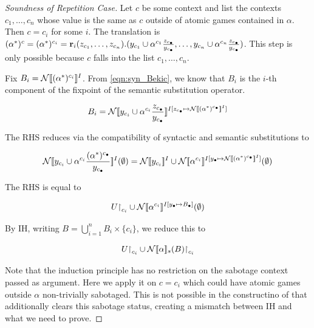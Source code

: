 \begin{proof}[Soundness of Repetition Case]
    Let $c$ be some context and list the contexts $c_1,\dots,c_n$ whose value is the same as $c$ outside of atomic games contained in $\alpha$. Then $c=c_i$ for some $i$. The translation is $\GLsrl{c}{(\alpha^*)} = \GLsrl{c_i}{(\alpha^*)} = \Rec_i(z_{c_1},\dots,z_{c_n}). (y_{c_1}\cup \alpha^{c_1}\frac{z_{c_\bullet}}{y_{c_\bullet}},\dots,y_{c_n}\cup \alpha^{c_n}\frac{z_{c_\bullet}}{y_{c_\bullet}})$. This step is only possible because $c$ falls into the list $c_1,\dots,c_n$.

    Fix $B_i = \N\ddl\GLsrl{c_i}{(\alpha^*)}\ddr^I$. From \autoref{eqn:syn_Bekic}, we know that $B_i$ is the $i$-th component of the fixpoint of the semantic substitution operator.

    \[B_i = \N\ddl y_{c_i}\cup \alpha^{c_i}\frac{z_{c_\bullet}}{y_{c_\bullet}} \ddr^{I[z_{c_\bullet} \mapsto \N\ddl(\alpha^*)^{c_\bullet}\ddr^I]}\]

    The RHS reduces via the compatibility of syntactic and semantic substitutions to

    \[\N\ddl y_{c_i}\cup \alpha^{c_i}\frac{(\alpha^*)^{c_\bullet}}{y_{c_\bullet}} \ddr^{I}(\emptyset) = \N\ddl y_{c_i}\ddr^I \cup \N\ddl\alpha^{c_i}\ddr^{I[y_\bullet \mapsto \N\ddl (\alpha^*)^{c_\bullet}\ddr^I]}(\emptyset) \]

    The RHS is equal to 

    \[U \restriction_{c_i} \cup \N\ddl \alpha^{c_i}\ddr^{I[y_\bullet \mapsto B_\bullet]}(\emptyset) \]

    By IH, writing $B = \bigcup_{i=1}^n B_i \times \{c_i\} $, we reduce this to

    \[U \restriction_{c_i} \cup \N\ddl \alpha\ddr_s(B) \restriction _{c_i} \]

    Note that the induction principle has no restriction on the sabotage context passed as argument. Here we apply it on $c=c_i$ which could have atomic games outside $\alpha$ non-trivially sabotaged. This is not possible in the constructino of \cite{Wafa_2024} that additionally clears this sabotage status, creating a mismatch between IH and what we need to prove.
\end{proof}